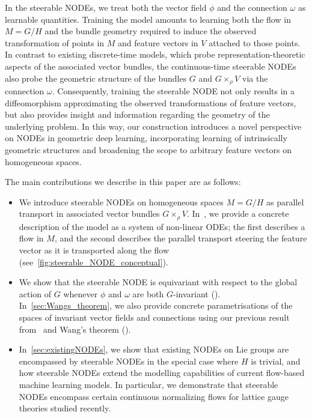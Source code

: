\documentclass[12pt,a4paper]{article}
\numberwithin{equation}{section}
\theoremstyle{plain}
\theoremstyle{definition}
\theoremstyle{remark}
\begin{document}
In the steerable NODEs, we treat both the vector field $\phi$ and the connection $\omega$ as learnable quantities. Training the model amounts to learning both the flow in $M = G/H$ and the bundle geometry required to induce the observed transformation of points in $M$ and feature vectors in $V$ attached to those points. In contrast to existing discrete-time models, which probe representation-theoretic aspects of the associated vector bundles, the continuous-time steerable NODEs also probe the geometric structure of the bundles $G$ and $G \times_{\rho} V$ via the connection $\omega$. Consequently, training the steerable NODE not only results in a diffeomorphism approximating the observed transformations of feature vectors, but also provides insight and information regarding the geometry of the underlying problem. In this way, our construction introduces a novel perspective on NODEs in geometric deep learning, incorporating learning of intrinsically geometric structures and broadening the scope to arbitrary feature vectors on homogeneous spaces.

The main contributions we describe in this paper are as follows:
\begin{itemize}
    \item We introduce steerable NODEs on homogeneous spaces $M=G/H$ as parallel transport in associated vector bundles $G \times_{\rho} V$. In~, we provide a concrete description of the model as a system of non-linear ODEs; the first describes a flow in $M$, and the second describes the parallel transport steering the feature vector as it is transported along the flow (see~\cref{fig:steerable_NODE_conceptual}).
    \item We show that the steerable NODE is equivariant with respect to the global action of $G$ whenever $\phi$ and $\omega$ are both $G$-invariant (). In~\cref{sec:Wangs_theorem}, we also provide concrete parametrisations of the spaces of invariant vector fields and connections using our previous result from~\cite{Andersdotter2025} and Wang's theorem ().
    \item In~\cref{sec:existingNODEs}, we show that existing NODEs on Lie groups are encompassed by steerable NODEs in the special case where $H$ is trivial, and how steerable NODEs extend the modelling capabilities of current flow-based machine learning models. In particular, we demonstrate that steerable NODEs encompass certain continuous normalizing flows for lattice gauge theories studied recently. 
\end{itemize}
\end{document}
